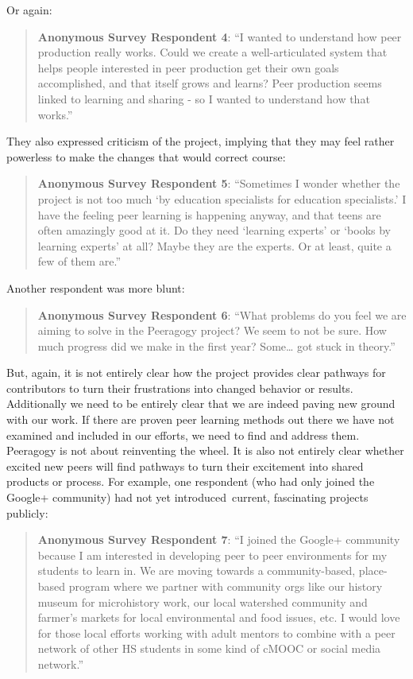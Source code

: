Or again:

\begin{quote}
\textbf{Anonymous Survey Respondent 4}: ``I wanted to understand how
peer production really works. Could we create a well-articulated
system that helps people interested in peer production get their own
goals accomplished, and that itself grows and learns? Peer production
seems linked to learning and sharing - so I wanted to understand how
that works.''
\end{quote}

They also expressed criticism of the project, implying that they may
feel rather powerless to make the changes that would correct course:

\begin{quote}
\textbf{Anonymous Survey Respondent 5}: ``Sometimes I wonder whether the
project is not too much `by education specialists for education
specialists.' I have the feeling peer learning is happening anyway, and
that teens are often amazingly good at it. Do they need `learning
experts' or `books by learning experts' at all? Maybe they are the
experts. Or at least, quite a few of them are.''
\end{quote}

Another respondent was more blunt:

\begin{quote}
\textbf{Anonymous Survey Respondent 6}: ``What problems do you feel we
are aiming to solve in the Peeragogy project? We seem to not be sure.
How much progress did we make in the first year? Some\ldots{} got stuck
in theory.''
\end{quote}

But, again, it is not entirely clear how the project provides clear
pathways for contributors to turn their frustrations into changed
behavior or results. Additionally we need to be entirely clear that we
are indeed paving new ground with our work. If there are proven peer
learning methods out there we have not examined and included in our
efforts, we need to find and address them. Peeragogy is not about
reinventing the wheel. It is also not entirely clear whether excited new
peers will find pathways to turn their excitement into shared products
or process. For example, one respondent (who had only joined the Google+
community) had not yet introduced~current, fascinating projects
publicly:

\begin{quote}
\textbf{Anonymous Survey Respondent 7}: ``I joined the Google+ community
because I am interested in developing peer to peer environments for my
students to learn in. We are moving towards a community-based,
place-based program where we partner with community orgs like our
history museum for microhistory work, our local watershed community and
farmer's markets for local environmental and food issues, etc. I would
love for those local efforts working with adult mentors to combine with
a peer network of other HS students in some kind of cMOOC or social
media network.''
\end{quote}

